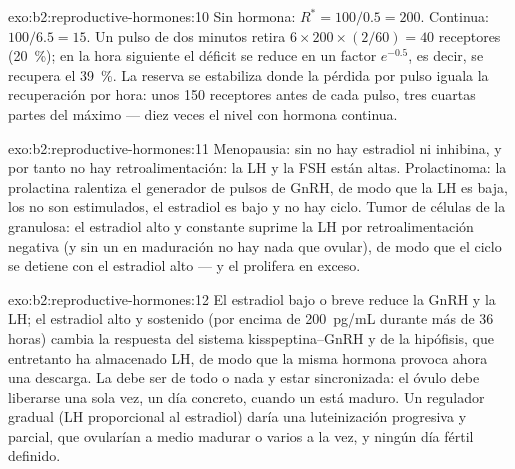 \begin{solution}{exo:b2:reproductive-hormones:10}
Sin hormona: $R^* = 100/0.5 = 200$. Continua: $100/6.5 = 15$. Un pulso de
dos minutos retira $6\times 200\times(2/60) = 40$ receptores
(\qty{20}{\%}); en la hora siguiente el déficit se reduce en un factor
$e^{-0.5}$, es decir, se recupera el \qty{39}{\%}. La reserva se
estabiliza donde la pérdida por pulso iguala la recuperación por hora:
unos 150 receptores antes de cada pulso, tres cuartas partes del máximo
--- diez veces el nivel con hormona continua.
\end{solution}

\begin{solution}{exo:b2:reproductive-hormones:11}
Menopausia: sin  no hay estradiol ni inhibina, y por tanto no hay
retroalimentación: la LH y la FSH están altas. Prolactinoma: la
prolactina ralentiza el generador de pulsos de GnRH, de modo que la LH es
baja, los  no son estimulados, el estradiol es bajo y no hay
ciclo. Tumor de células de la granulosa: el estradiol alto y constante
suprime la LH por retroalimentación negativa (y sin un  en
maduración no hay nada que ovular), de modo que el ciclo se detiene con el
estradiol alto --- y el  prolifera en exceso.
\end{solution}

\begin{solution}{exo:b2:reproductive-hormones:12}
El estradiol bajo o breve reduce la GnRH y la LH; el estradiol alto y
sostenido (por encima de \qty{200}{pg/mL} durante más de 36 horas)
cambia la respuesta del sistema kisspeptina--GnRH y de la hipófisis, que
entretanto ha almacenado LH, de modo que la misma hormona provoca ahora
una descarga. La  debe ser de todo o nada y estar sincronizada:
el óvulo debe liberarse una sola vez, un día concreto, cuando un 
está maduro. Un regulador gradual (LH proporcional al estradiol) daría una
luteinización progresiva y parcial,  que ovularían a medio
madurar o varios a la vez, y ningún día fértil definido.
\end{solution}

